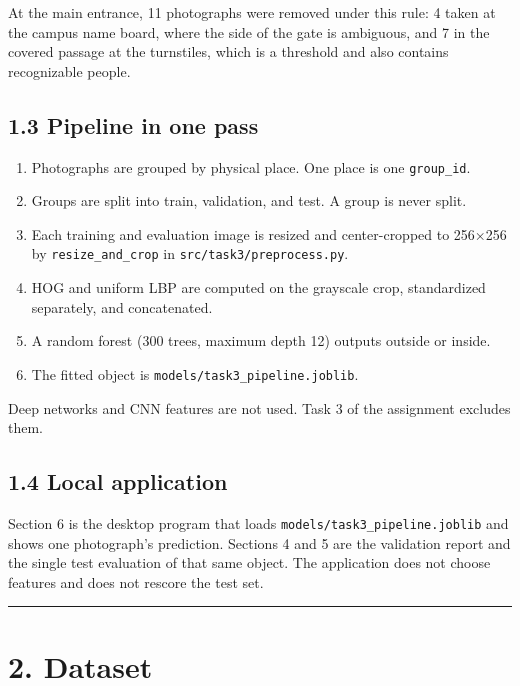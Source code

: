\documentclass[11pt,a4paper]{article}
\providecommand{\tightlist}{%
  \setlength{\itemsep}{0pt}\setlength{\parskip}{0pt}}
\begin{document}
At the main entrance, 11 photographs were removed under this rule: 4 taken at the campus name board, where the side of the gate is ambiguous, and 7 in the covered passage at the turnstiles, which is a threshold and also contains recognizable people.

\subsection{1.3 Pipeline in one pass}\label{pipeline-in-one-pass}

\begin{enumerate}
\def\labelenumi{\arabic{enumi}.}
\tightlist
\item
  Photographs are grouped by physical place. One place is one \texttt{group\_\allowbreak{}id}.
\item
  Groups are split into train, validation, and test. A group is never split.
\item
  Each training and evaluation image is resized and center-cropped to 256×256 by \texttt{resize\_\allowbreak{}and\_\allowbreak{}crop} in \texttt{src/\allowbreak{}task3/\allowbreak{}preprocess.py}.
\item
  HOG and uniform LBP are computed on the grayscale crop, standardized separately, and concatenated.
\item
  A random forest (300 trees, maximum depth 12) outputs outside or inside.
\item
  The fitted object is \texttt{models/\allowbreak{}task3\_\allowbreak{}pipeline.joblib}.
\end{enumerate}

Deep networks and CNN features are not used. Task 3 of the assignment excludes them.

\subsection{1.4 Local application}\label{local-application}

Section 6 is the desktop program that loads \texttt{models/\allowbreak{}task3\_\allowbreak{}pipeline.joblib} and shows one photograph's prediction. Sections 4 and 5 are the validation report and the single test evaluation of that same object. The application does not choose features and does not rescore the test set.

\begin{center}\rule{0.5\linewidth}{0.5pt}\end{center}

\section{2. Dataset}\label{dataset}
\end{document}
